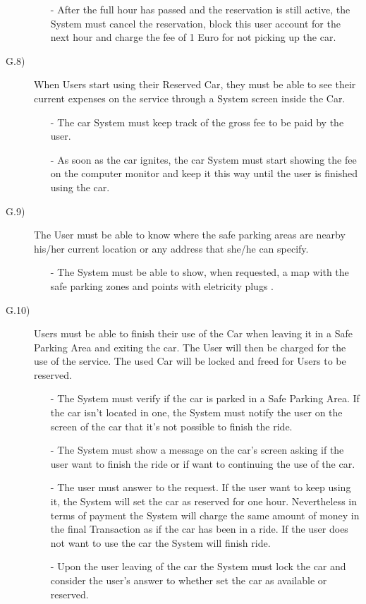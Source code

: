 \documentclass[a4paper]{article}
\begin{document}
\begin{description}
\begin{itemize}
	\item[-]After the full hour has passed and the reservation is still active, the System must cancel the reservation, block this user account for the next hour and charge the fee of 1 Euro for not picking up the car.
\end{itemize}
\item [G.8)]When Users start using their Reserved Car, they must be able to see their current expenses on the service through a System screen inside the Car.
\begin{itemize}
	\item[-]The car System must keep track of the gross fee to be paid by the user.
	\item[-]As soon as the car ignites, the car System must start showing the fee on the computer monitor and keep it this way until the user is finished using the car.
\end{itemize}
\item [G.9)]The User must be able to know where the safe parking areas are nearby his/her current location or any address that she/he can specify.
\begin{itemize}
	\item[-]The System must be able to show, when requested, a map with the safe parking zones and points with eletricity plugs .
\end{itemize}
\item [G.10)]Users must be able to finish their use of the Car when leaving it in a Safe Parking Area and exiting the car. The User will then be charged for the use of the service. The used Car will be locked and freed for Users to be reserved.
\begin{itemize}
	\item[-]The System must verify if the car is parked in a Safe Parking Area. If the car isn't located in one, the System must notify the user on the screen of the car that it's not possible to finish the ride.
	\item[-]The System must show a message on the car's screen asking if the user want to finish the ride or if want to continuing the use of the car.
	\item[-]The user must answer to the request. If the user want to keep using it, the System will set the car as reserved for one hour. Nevertheless in terms of payment the System will charge the same amount of money in the final Transaction as if the car has been in a ride. If the user does not want to use the car the System will finish ride.
	\item[-]Upon the user leaving of the car the System must lock the car and consider the user's answer to whether set the car as available or reserved.

\end{itemize}
\end{description}
\end{document}
